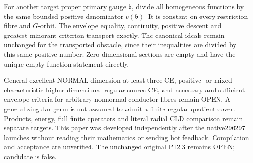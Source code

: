 \documentclass[11pt]{article}
\begin{document}
For another target proper primary gauge $\mathfrak b$, divide all
homogeneous functions by the same bounded positive denominator
$v(\mathfrak b)$. It is constant on every restriction fibre and
$G$-orbit. The envelope equality, continuity, positive descent and
greatest-minorant criterion transport exactly. The canonical ideals
remain unchanged for the transported obstacle, since their inequalities
are divided by this same positive number. Zero-dimensional sections
are empty and have the unique empty-function statement directly.

General excellent NORMAL dimension at least three CE, positive- or
mixed-characteristic higher-dimensional regular-source CE, and
necessary-and-sufficient envelope criteria for arbitrary nonnormal
conductor fibres remain OPEN. A general singular germ is not assumed
to admit a finite regular quotient cover. Products, energy, full finite
operators and literal radial CLD comparison remain separate targets.
This paper was developed independently after the native296297 launches
without reading their mathematics or sending hot feedback. Compilation
and acceptance are unverified. The unchanged original P12.3 remains OPEN;
candidate is false.
\end{document}
